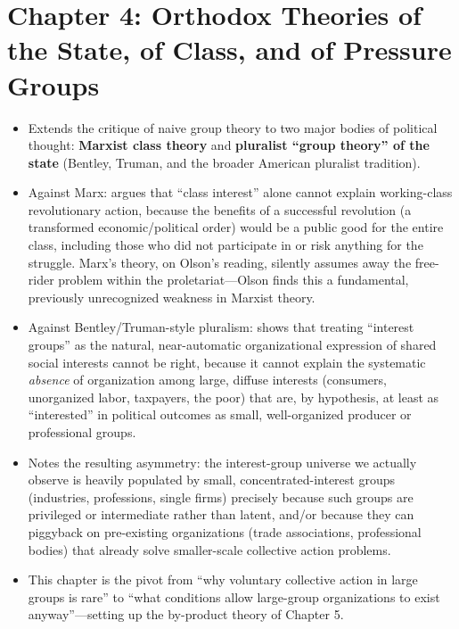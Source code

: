 \documentclass[12pt]{article}
\begin{document}
\section{Chapter 4: Orthodox Theories of the State, of Class, and of Pressure Groups}

\begin{itemize}[leftmargin=*, itemsep=4pt]
    \item Extends the critique of naive group theory to two major bodies of political thought: \textbf{Marxist class theory} and \textbf{pluralist ``group theory'' of the state} (Bentley, Truman, and the broader American pluralist tradition).
    \item Against Marx: argues that ``class interest'' alone cannot explain working-class revolutionary action, because the benefits of a successful revolution (a transformed economic/political order) would be a public good for the entire class, including those who did not participate in or risk anything for the struggle. Marx's theory, on Olson's reading, silently assumes away the free-rider problem within the proletariat---Olson finds this a fundamental, previously unrecognized weakness in Marxist theory.
    \item Against Bentley/Truman-style pluralism: shows that treating ``interest groups'' as the natural, near-automatic organizational expression of shared social interests cannot be right, because it cannot explain the systematic \emph{absence} of organization among large, diffuse interests (consumers, unorganized labor, taxpayers, the poor) that are, by hypothesis, at least as ``interested'' in political outcomes as small, well-organized producer or professional groups.
    \item Notes the resulting asymmetry: the interest-group universe we actually observe is heavily populated by small, concentrated-interest groups (industries, professions, single firms) precisely because such groups are privileged or intermediate rather than latent, and/or because they can piggyback on pre-existing organizations (trade associations, professional bodies) that already solve smaller-scale collective action problems.
    \item This chapter is the pivot from ``why voluntary collective action in large groups is rare'' to ``what conditions allow large-group organizations to exist anyway''---setting up the by-product theory of Chapter 5.
\end{itemize}
\end{document}
